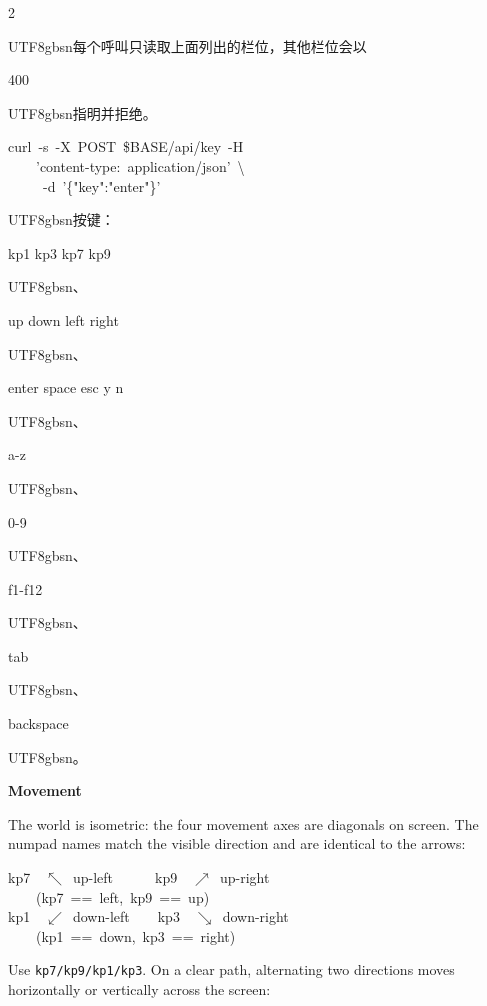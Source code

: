 \begin{paracol}{2}
\begin{CJK}{UTF8}{gbsn}每个呼叫只读取上面列出的栏位，其他栏位会以\end{CJK} 400 \begin{CJK}{UTF8}{gbsn}指明并拒绝。\end{CJK}\par
{\ttfamily\scriptsize\raggedright\noindent curl\ -s\ -X\ POST\ \$BASE/api/key\ -H\\\ \ \ \ 'content-type:\ application/json'\ \textbackslash{}\\\ \ \ \ \ -d\ '\{"key":"enter"\}'\par}
\begin{CJK}{UTF8}{gbsn}按键：\end{CJK}kp1 kp3 kp7 kp9\begin{CJK}{UTF8}{gbsn}、\end{CJK}up down left right\begin{CJK}{UTF8}{gbsn}、\end{CJK}enter space esc y n\begin{CJK}{UTF8}{gbsn}、\end{CJK}a-z\begin{CJK}{UTF8}{gbsn}、\end{CJK}0-9\begin{CJK}{UTF8}{gbsn}、\end{CJK} f1-f12\begin{CJK}{UTF8}{gbsn}、\end{CJK}tab\begin{CJK}{UTF8}{gbsn}、\end{CJK}backspace\begin{CJK}{UTF8}{gbsn}。\end{CJK}\par
\switchcolumn*
\footnotesize\setlength{\parskip}{2pt}
{\footnotesize\bfseries Movement\par}
The world is isometric: the four movement axes are diagonals on screen. The numpad names match the visible direction and are identical to the arrows:\par
{\ttfamily\scriptsize\raggedright\noindent kp7\ \ $\nwarrow$\ up-left\ \ \ \ \ \ kp9\ \ $\nearrow$\ up-right\ \ \ \ \ \ \ \\\ \ \ \ (kp7\ ==\ left,\ kp9\ ==\ up)\\kp1\ \ $\swarrow$\ down-left\ \ \ \ kp3\ \ $\searrow$\ down-right\ \ \ \ \ \\\ \ \ \ (kp1\ ==\ down,\ kp3\ ==\ right)\par}
Use \texttt{kp7/kp9/kp1/kp3}. On a clear path, alternating two directions moves horizontally or vertically across the screen:\par

\end{paracol}
